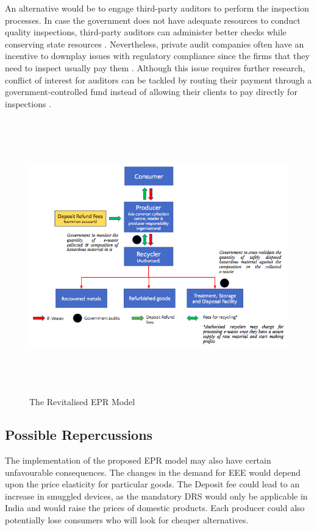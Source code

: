 \documentclass[a4paper, 12pt]{article}
\begin{document}
                    An alternative would be to engage third-party auditors to perform the inspection processes. In case the government does not have adequate resources to conduct quality inspections, third-party auditors can administer better checks while conserving state resources \parencite{mcallisterreport}. Nevertheless, private audit companies often have an incentive to downplay issues with regulatory compliance since the firms that they need to inspect usually pay them \parencite{shorttoffelpaper}. Although this issue requires further research, conflict of interest for auditors can be tackled by routing their payment through a government-controlled fund instead of allowing their clients to pay directly for inspections \parencite{duflopaper}.\\

                     
\begin{figure}[H]
\centering
\includegraphics[height = 4.7in]{fig4.png}
\caption[Optional Caption]{The Revitalised EPR Model}
\end{figure}
                    
                    
\subsection{Possible Repercussions}
                    
                    The implementation of the proposed EPR model may also have certain unfavourable consequences. The changes in the demand for EEE would depend upon the price elasticity for particular goods. The Deposit fee could lead to an increase in smuggled devices, as the mandatory DRS would only be applicable in India and would raise the prices of domestic products. Each producer could also potentially lose consumers who will look for cheaper alternatives. 
                    
\end{document}
